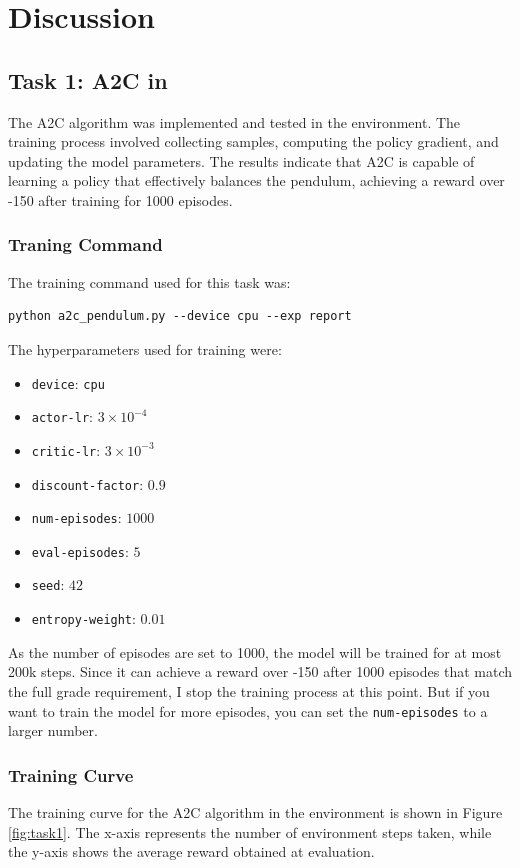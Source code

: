 \section{Discussion}
\label{sec:discussion}

\subsection{Task 1: A2C in \pendulum}
\label{sec:task1-discussion}

The A2C algorithm was implemented and tested in the \pendulum environment.
The training process involved collecting samples, computing the policy gradient, and updating the model parameters.
The results indicate that A2C is capable of learning a policy that effectively balances the pendulum, achieving a reward over -150 after training for 1000 episodes.

\subsubsection{Traning Command}
The training command used for this task was:
\begin{verbatim}
python a2c_pendulum.py --device cpu --exp report
\end{verbatim}

The hyperparameters used for training were:
\begin{itemize}
    \item \texttt{device}: \texttt{cpu}
    \item \texttt{actor-lr}: $3\times 10^{-4}$
    \item \texttt{critic-lr}: $3\times 10^{-3}$
    \item \texttt{discount-factor}: $0.9$
    \item \texttt{num-episodes}: $1000$
    \item \texttt{eval-episodes}: $5$
    \item \texttt{seed}: $42$
    \item \texttt{entropy-weight}: $0.01$
\end{itemize}

As the number of episodes are set to 1000, the model will be trained for at most 200k steps.
Since it can achieve a reward over -150 after 1000 episodes that match the full grade requirement, I stop the training process at this point.
But if you want to train the model for more episodes, you can set the \texttt{num-episodes} to a larger number.

\subsubsection{Training Curve}
The training curve for the A2C algorithm in the \pendulum environment is shown in Figure \ref{fig:task1}.
The x-axis represents the number of environment steps taken, while the y-axis shows the average reward obtained at evaluation.

